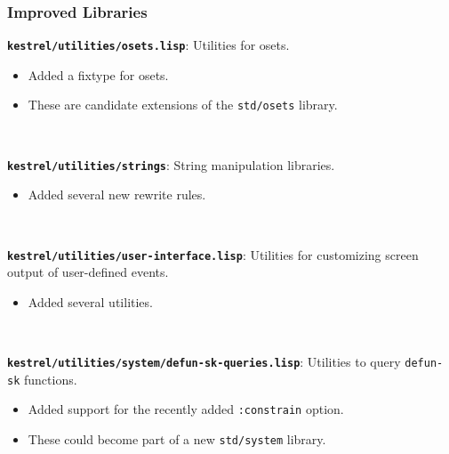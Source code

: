 \documentclass{beamer}
\newcommand{\code}[1]{\texttt{#1}}
\newcommand{\bookpath}[1]{\textbf{\code{#1}}}
\newcommand{\implibtitle}{\frametitle{Improved Libraries}}
\begin{document}
\begin{frame}

\implibtitle

\bookpath{kestrel/utilities/osets.lisp}:
Utilities for osets.
\begin{itemize}
\item
Added a fixtype for osets.
\item
These are candidate extensions of the \code{std/osets} library.
\end{itemize}

\

\bookpath{kestrel/utilities/strings}:
String manipulation libraries.
\begin{itemize}
\item Added several new rewrite rules.
\end{itemize}

\

\bookpath{kestrel/utilities/user-interface.lisp}:
Utilities for customizing screen output of user-defined events.
\begin{itemize}
\item
Added several utilities.
\end{itemize}

\

\bookpath{kestrel/utilities/system/defun-sk-queries.lisp}:
Utilities to query \code{defun-sk} functions.
\begin{itemize}
\item
Added support for the recently added \code{:constrain} option.
\item
These could become part of a new \code{std/system} library.
\end{itemize}

\end{frame}

\end{document}
